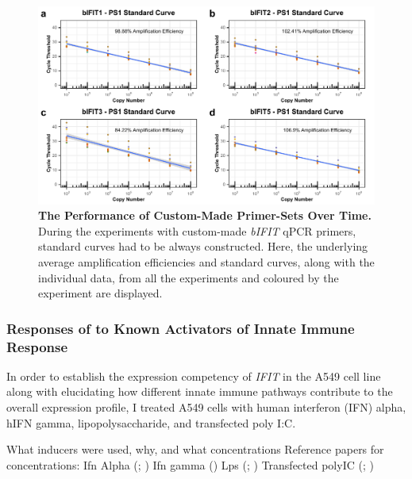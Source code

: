 \begin{figure}
    \centering
    \includegraphics[width=1\linewidth]{07. Chapter 2/Figs/01. Technologies/03. standard curves behaviour.pdf}
    \caption[The Performance of Custom-Made Primer-Sets Over Time.]{\textbf{The Performance of Custom-Made Primer-Sets Over Time.} During the experiments with custom-made \textit{bIFIT} qPCR primers, standard curves had to be always constructed. Here, the underlying average amplification efficiencies and standard curves, along with the individual data, from all the experiments and coloured by the experiment are displayed.}
    \label{The Performance of Custom-Made Primer-Sets Over Time}
\end{figure}





















\subsubsection{Responses of to Known Activators of Innate Immune Response} \label{Responses to Known Activators of Innate Immune Response}
In order to establish the expression competency of \textit{IFIT} in the A549 cell line along with elucidating how different innate immune pathways contribute to the overall expression profile, I treated A549 cells with human interferon (IFN) alpha, hIFN gamma, lipopolysaccharide, and transfected poly I:C. 


What inducers were used, why, and what concentrations \newline
Reference papers for concentrations: \newline
Ifn Alpha (\cite{Terenzi2006DistinctISG56}; \cite{Santhakumar2018ChickenViruses})\newline
Ifn gamma ()\newline
Lps (\cite{Mears2019Ifit1Cells}; \cite{Zhang2019GrouperResponse})\newline
Transfected polyIC (\cite{Mears2019Ifit1Cells}; \cite{Palchetti2015TransfectedCells}) \newline

